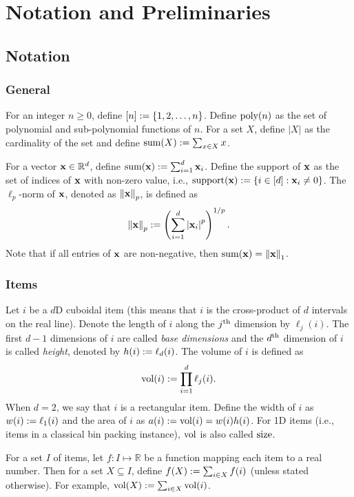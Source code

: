 \chapter{Notation and Preliminaries}
\label{chap:preliminaries}

\section{Notation}

\subsection{General}

For an integer $n \ge 0$, define $[n] := \{1, 2, \ldots, n\}$.
Define $\operatorname{poly}(n)$ as the set of polynomial and sub-polynomial functions of $n$.
For a set $X$, define $|X|$ as the cardinality of the set
and define $\operatorname{sum}(X) := \sum_{x \in X} x$.

For a vector $\mathbf{x} \in \mathbb{R}^d$, define $\operatorname{sum}(\mathbf{x}) := \sum_{i=1}^d \mathbf{x}_i$.
Define the support of $\mathbf{x}$ as the set of indices of $\mathbf{x}$ with non-zero value,
i.e., $\operatorname{support}(\mathbf{x}) := \{i \in [d]: \mathbf{x}_i \neq 0\}$.
The $\ell_p$-norm of $\mathbf{x}$, denoted as $\left\lVert \mathbf{x} \right\rVert_p$, is defined as
\[ \left\lVert \mathbf{x} \right\rVert_p := \left( \sum_{i=1}^d \left\lvert \mathbf{x}_i \right\rvert^p \right)^{1/p}. \]
Note that if all entries of $\mathbf{x}$ are non-negative, then $\operatorname{sum}(\mathbf{x}) = \left\lVert \mathbf{x} \right\rVert_1$.

\subsection{Items}

Let $i$ be a $d$D cuboidal item
(this means that $i$ is the cross-product of $d$ intervals on the real line).
Denote the length of $i$ along the $j^{\textrm{th}}$ dimension by $\ell_j(i)$.
The first $d-1$ dimensions of $i$ are called \emph{base dimensions}
and the $d^{\textrm{th}}$ dimension of $i$ is called \emph{height}, denoted by $h(i) := \ell_d(i)$.
The volume of $i$ is defined as
\[ \operatorname{vol}(i) := \prod_{i=1}^d \ell_j(i). \]
When $d=2$, we say that $i$ is a rectangular item.
Define the width of $i$ as $w(i) := \ell_1(i)$
and the area of $i$ as $a(i) := \operatorname{vol}(i) = w(i)h(i)$.
For 1D items (i.e., items in a classical bin packing instance),
$\operatorname{vol}$ is also called $\operatorname{size}$.

For a set $I$ of items, let $f: I \mapsto \mathbb{R}$ be a function
mapping each item to a real number.
Then for a set $X \subseteq I$, define $f(X) := \sum_{i \in X} f(i)$
(unless stated otherwise).
For example, $\operatorname{vol}(X) := \sum_{i \in X} \operatorname{vol}(i)$.

